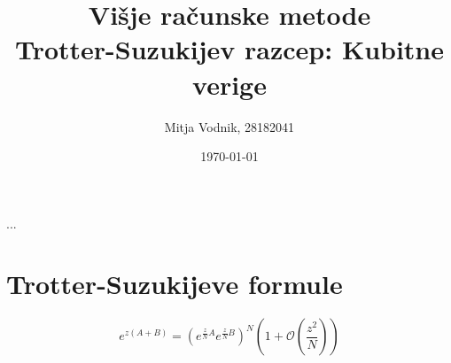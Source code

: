\documentclass[a4paper]{article}
\newcommand{\bigO}[1]{\mathcal{O}\left( #1 \right)}
\begin{document}
    \title{\sc\large Višje računske metode\\
		\bigskip
		\bf\Large Trotter-Suzukijev razcep: Kubitne verige}
	\author{Mitja Vodnik, 28182041}
	\date{\today}
	\maketitle

    ...

	\section{Trotter-Suzukijeve formule}

    \begin{equation}\label{trotter}
        e^{z(A + B)} = \left( e^{\frac{z}{N}A}e^{\frac{z}{N}B} \right)^N \left( 1 + \bigO{\frac{z^2}{N}} \right)
    \end{equation}

    \iffalse
    \begin{figure}
        \centering
        \texttt{[image: comparison/comparison]}
        \caption{Maksimalno relativno odstopanje od konstantne energije na eni trajektoriji ob uporabi različnih shem: 
        Trotterjeva formula (T1) \ref{trotter},
        Suzukijeva 2. reda (S2) \ref{suzuki2},
        Suzukijeva 4. reda (S4) \ref{suzuki4} in 
        Runge-Kutta 4. reda (RK4).
        (Vse trajektorije so računane do časa okoli $t = 10000$ pri parametru $\lambda = 0$.)}
        \label{comparison}
    \end{figure}
    \fi
\end{document}
